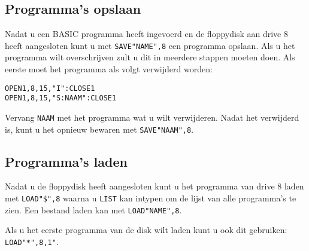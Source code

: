 \documentclass{article}
\begin{document}
\subsection{Programma's opslaan}

Nadat u een BASIC programma heeft ingevoerd en de floppydisk aan drive 8 heeft aangesloten kunt u met \verb:SAVE"NAME",8: een programma opslaan.
Als u het programma wilt overschrijven zult u dit in meerdere stappen moeten doen.
Als eerste moet het programma als volgt verwijderd worden:

\begin{lstlisting}
OPEN1,8,15,"I":CLOSE1
OPEN1,8,15,"S:NAAM":CLOSE1
\end{lstlisting}

Vervang \verb:NAAM: met het programma wat u wilt verwijderen.
Nadat het verwijderd is, kunt u het opnieuw bewaren met \verb:SAVE"NAAM",8:.

\subsection{Programma's laden}

Nadat u de floppydisk heeft aangesloten kunt u het programma van drive 8 laden met \verb:LOAD"$",8: waarna u \verb:LIST: kan intypen om de lijst van alle programma's te zien.
Een bestand laden kan met \verb:LOAD"NAME",8:.

Als u het eerste programma van de disk wilt laden kunt u ook dit gebruiken: \verb:LOAD"*",8,1":.
\end{document}
